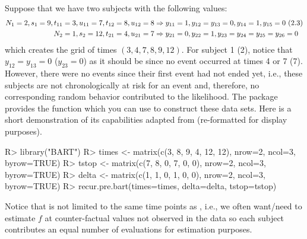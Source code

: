\documentclass[article]{jss}
\begin{document}
Suppose that we have two subjects with the following values:
\begin{align*}
N_1=2, s_1=9, {t}_{11}=3, {u}_{11}=7, {t}_{12}=8, {u}_{12}=8 & 
\Rightarrow y_{11}=1, y_{12}=y_{13}=0, y_{14}=1, y_{15}=0\ (2.3)\\
N_2=1, s_2=12, {t}_{21}=4, {u}_{21}=7 & 
\Rightarrow y_{21}=0, y_{22}=1, y_{23}=y_{24}=y_{25}=y_{26}=0 \notag
\end{align*}
which creates the grid of times $(3, 4, 7, 8, 9, 12)$.  For subject 1
(2), notice that $y_{12}=y_{13}=0$ ($y_{23}=0$) as it should be since
no event occurred at times 4 or 7 (7).  However, there were no events 
since their first event had not ended yet, i.e., these subjects are not
chronologically at risk for an event and, therefore, no corresponding random 
behavior contributed to the likelihood.  The  package provides the
 function which you can use to construct these
data sets.  Here is a short demonstration of its capabilities adapted
from  (re-formatted for display purposes).
\begin{Sinput}
R> library("BART")
R> times <- matrix(c(3, 8, 9, 4, 12, 12), nrow=2, ncol=3, byrow=TRUE)
R> tstop <- matrix(c(7, 8, 0, 7,  0,  0), nrow=2, ncol=3, byrow=TRUE)
R> delta <- matrix(c(1, 1, 0, 1,  0,  0), nrow=2, ncol=3, byrow=TRUE)
R> recur.pre.bart(times=times, delta=delta, tstop=tstop)
\end{Sinput}
Notice that  is not limited to the same time points as
, i.e., we often want/need to estimate $f$
at counter-factual values not observed in the data so each subject
contributes an equal number of evaluations for estimation purposes.
 
\end{document}
